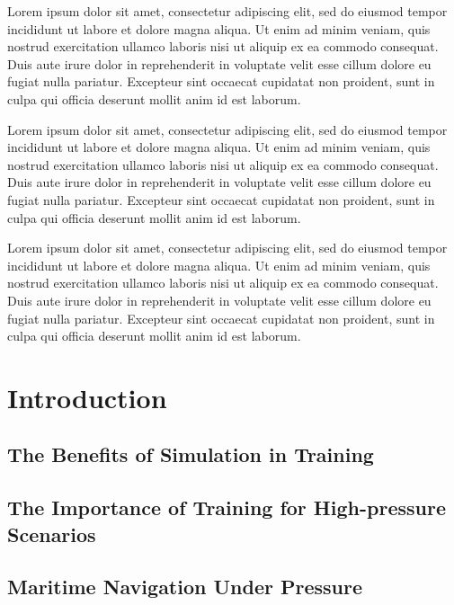 \documentclass[12pt]{article}
\begin{document}
Lorem ipsum dolor sit amet, consectetur adipiscing elit, sed do eiusmod tempor incididunt ut labore et dolore magna aliqua. Ut enim ad minim veniam, quis nostrud exercitation ullamco laboris nisi ut aliquip ex ea commodo consequat. Duis aute irure dolor in reprehenderit in voluptate velit esse cillum dolore eu fugiat nulla pariatur. Excepteur sint occaecat cupidatat non proident, sunt in culpa qui officia deserunt mollit anim id est laborum.

Lorem ipsum dolor sit amet, consectetur adipiscing elit, sed do eiusmod tempor incididunt ut labore et dolore magna aliqua. Ut enim ad minim veniam, quis nostrud exercitation ullamco laboris nisi ut aliquip ex ea commodo consequat. Duis aute irure dolor in reprehenderit in voluptate velit esse cillum dolore eu fugiat nulla pariatur. Excepteur sint occaecat cupidatat non proident, sunt in culpa qui officia deserunt mollit anim id est laborum.

Lorem ipsum dolor sit amet, consectetur adipiscing elit, sed do eiusmod tempor incididunt ut labore et dolore magna aliqua. Ut enim ad minim veniam, quis nostrud exercitation ullamco laboris nisi ut aliquip ex ea commodo consequat. Duis aute irure dolor in reprehenderit in voluptate velit esse cillum dolore eu fugiat nulla pariatur. Excepteur sint occaecat cupidatat non proident, sunt in culpa qui officia deserunt mollit anim id est laborum.

\newpage

\tableofcontents

\newpage

\listoftables

\newpage

\listoffigures

\section{Introduction}

\subsection{The Benefits of Simulation in Training}

\subsection{The Importance of Training for High-pressure Scenarios}

\subsection{Maritime Navigation Under Pressure} 
\end{document}
